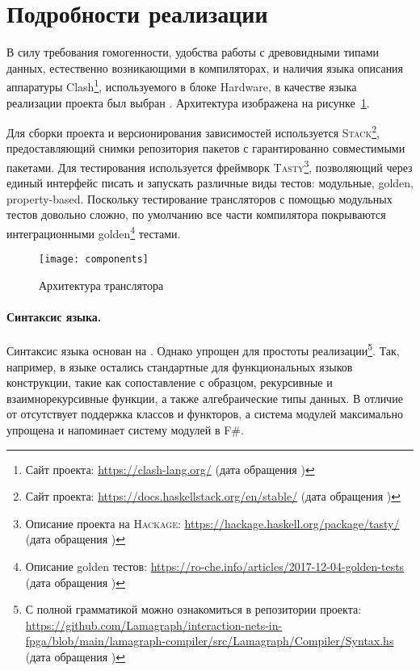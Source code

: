 
\section{Подробности реализации}

В силу требования гомогенности, удобства работы с древовидными типами данных, естественно возникающими в компиляторах, и наличия языка описания аппаратуры Clash\footnote{Сайт проекта: \url{https://clash-lang.org/} (дата обращения )}, используемого в блоке Hardware, в качестве языка реализации проекта был выбран \Haskell{}.
Архитектура изображена на рисунке~\ref{fig:lmlcmods}.

Для сборки проекта и версионирования зависимостей используется \textsc{Stack}\footnote{Сайт проекта: \url{https://docs.haskellstack.org/en/stable/} (дата обращения )}, предоставляющий снимки репозитория пакетов с гарантированно совместимыми пакетами.
Для тестирования используется фреймворк \textsc{Tasty}\footnote{Описание проекта на \textsc{Hackage}: \url{https://hackage.haskell.org/package/tasty/} (дата обращения )}, позволяющий через единый интерфейс писать и запускать различные виды тестов: модульные, golden, property-based.
Поскольку тестирование трансляторов с помощью модульных тестов довольно сложно, по умолчанию все части компилятора покрываются интеграционными golden\footnote{Описание golden тестов: \url{https://ro-che.info/articles/2017-12-04-golden-tests} (дата обращения )} тестами.

\begin{figure}[h]
    \begin{center}
        \texttt{[image: components]}
    \end{center}
    \caption{Архитектура транслятора}
    \label{fig:lmlcmods}
\end{figure}

\paragraph{Синтаксис языка.}

Синтаксис языка основан на \OCaml{}.
Однако упрощен для простоты реализации\footnote{С полной грамматикой можно ознакомиться в репозитории проекта: \url{https://github.com/Lamagraph/interaction-nets-in-fpga/blob/main/lamagraph-compiler/src/Lamagraph/Compiler/Syntax.hs} (дата обращения )}.
Так, например, в языке остались стандартные для функциональных языков конструкции, такие как сопоставление с образцом, рекурсивные и взаимнорекурсивные функции, а также алгебраические типы данных.
В отличие от \OCaml{} отсутствует поддержка классов и функторов, а система модулей максимально упрощена и напоминает систему модулей в F\#.


